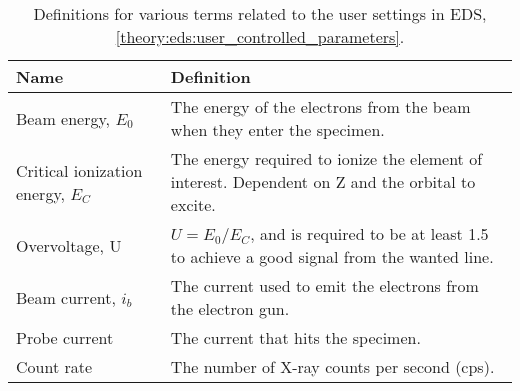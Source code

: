 \begin{table}[pht]
    \begin{center}
        \caption{
            Definitions for various terms related to the user settings in EDS, \cref{theory:eds:user_controlled_parameters}.
        }
        \renewcommand*{\arraystretch}{1.4}
        \label{tab:eds:userparameters}
        \begin{tabular}{p{2.6cm}p{12cm}}
            \hline
            \textbf{Name}                     & \textbf{Definition}                                                                                                                                                                                                        \\
            \hline
            Beam energy, $E_0$                & The energy of the electrons from the beam when they enter the specimen.                                                                                                                                                    \\
            Critical ionization energy, $E_C$ & The energy required to ionize the element of interest. Dependent on Z and the orbital to excite.                                                                                                                           \\
            Overvoltage, U                    & $ U = E_0 / E_C $, and is required to be at least 1.5 to achieve a good signal from the wanted line.                                                                                                                       \\
            Beam current, $i_b$               & The current used to emit the electrons from the electron gun.                                                                                                                                                              \\
            Probe current                     & The current that hits the specimen.                                                                                                                                                                                        \\
            Count rate                        & The number of X-ray counts per second (cps).                                                                                                                                                                               \\

\end{tabular}
\end{center}
\end{table}
